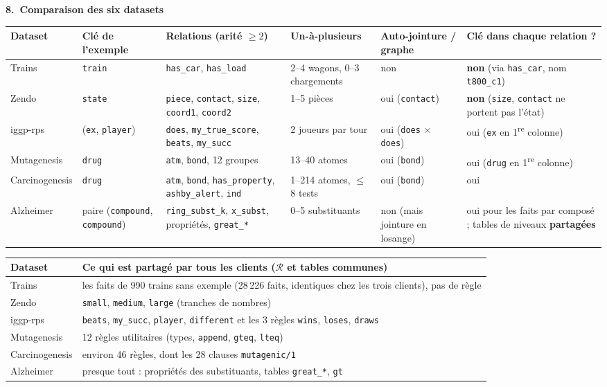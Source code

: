 \documentclass[10pt]{article}
\newcommand{\titrebox}[2]{\needspace{10\baselineskip}\vspace{8pt}
  \begin{tcolorbox}[colback=marine, colframe=marine, arc=0pt, boxrule=0pt,
    top=4pt, bottom=4pt, left=8pt]
  \color{white}\Large\bfseries #1.~#2
  \end{tcolorbox}\vspace{2pt}}
\begin{document}
\titrebox{8}{Comparaison des six datasets}
\renewcommand{\arraystretch}{1.3}
{\footnotesize
\begin{tabular}{@{}L{1.9cm}L{2.2cm}L{3.1cm}L{2.9cm}L{2.2cm}L{3.8cm}@{}}
\textbf{Dataset} & \textbf{Clé de l'exemple} & \textbf{Relations (arité $\ge2$)} & \textbf{Un-à-plusieurs} & \textbf{Auto-jointure / graphe} & \textbf{Clé dans chaque relation ?}\\\hline
Trains & \texttt{train} & \texttt{has\_car}, \texttt{has\_load} & 2--4 wagons, 0--3 chargements & non & \textbf{non} (via \texttt{has\_car}, nom \texttt{t800\_c1})\\
Zendo & \texttt{state} & \texttt{piece}, \texttt{contact}, \texttt{size}, \texttt{coord1}, \texttt{coord2} & 1--5 pièces & oui (\texttt{contact}) & \textbf{non} (\texttt{size}, \texttt{contact} ne portent pas l'état)\\
iggp-rps & (\texttt{ex}, \texttt{player}) & \texttt{does}, \texttt{my\_true\_score}, \texttt{beats}, \texttt{my\_succ} & 2 joueurs par tour & oui (\texttt{does} $\times$ \texttt{does}) & oui (\texttt{ex} en 1\textsuperscript{re} colonne)\\
Mutagenesis & \texttt{drug} & \texttt{atm}, \texttt{bond}, 12 groupes & 13--40 atomes & oui (\texttt{bond}) & oui (\texttt{drug} en 1\textsuperscript{re} colonne)\\
Carcinogenesis & \texttt{drug} & \texttt{atm}, \texttt{bond}, \texttt{has\_property}, \texttt{ashby\_alert}, \texttt{ind} & 1--214 atomes, $\le$ 8 tests & oui (\texttt{bond}) & oui\\
Alzheimer & paire (\texttt{compound}, \texttt{compound}) & \texttt{ring\_subst\_k}, \texttt{x\_subst}, propriétés, \texttt{great\_*} & 0--5 substituants & non (mais jointure en losange) & oui pour les faits par composé ; tables de niveaux \textbf{partagées}\\
\end{tabular}}

\vspace{4pt}
\renewcommand{\arraystretch}{1.3}
{\footnotesize
\begin{tabular}{@{}L{1.9cm}L{14.5cm}@{}}
\textbf{Dataset} & \textbf{Ce qui est partagé par tous les clients ($\mathcal{R}$ et tables communes)}\\\hline
Trains & les faits de 990 trains sans exemple (28\,226 faits, identiques chez les trois clients), pas de règle\\
Zendo & \texttt{small}, \texttt{medium}, \texttt{large} (tranches de nombres)\\
iggp-rps & \texttt{beats}, \texttt{my\_succ}, \texttt{player}, \texttt{different} et les 3 règles \texttt{wins}, \texttt{loses}, \texttt{draws}\\
Mutagenesis & 12 règles utilitaires (types, \texttt{append}, \texttt{gteq}, \texttt{lteq})\\
Carcinogenesis & environ 46 règles, dont les 28 clauses \texttt{mutagenic/1}\\
Alzheimer & presque tout : propriétés des substituants, tables \texttt{great\_*}, \texttt{gt}\\
\end{tabular}}
\end{document}
